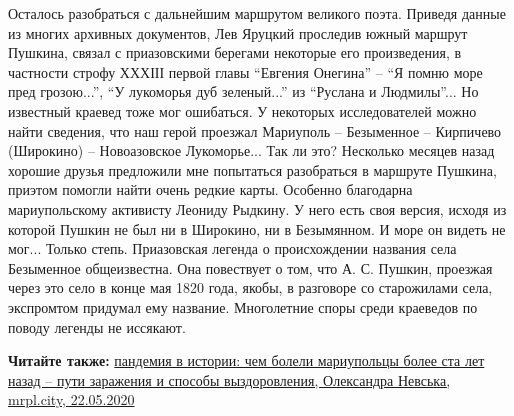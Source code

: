 
Осталось разобраться с дальнейшим маршрутом великого поэта. Приведя данные из
многих архивных документов, Лев Яруцкий проследив южный маршрут Пушкина, связал
с приазовскими берегами некоторые его произведения, в частности строфу ХХХІІІ
первой главы \enquote{Евгения Онегина} – \enquote{Я помню море пред грозою...}, \enquote{У лукоморья дуб
зеленый...} из \enquote{Руслана и Людмилы}... Но известный краевед тоже мог ошибаться. У
некоторых исследователей можно найти сведения, что наш герой проезжал Мариуполь
– Безыменное – Кирпичево (Широкино) – Новоазовское Лукоморье... Так ли это?
Несколько месяцев назад хорошие друзья предложили мне попытаться разобраться в
маршруте Пушкина, приэтом помогли найти очень редкие карты. Особенно благодарна
мариупольскому активисту Леониду Рыдкину. У него есть своя версия, исходя из
которой Пушкин не был ни в Широкино, ни в Безымянном. И море он видеть не
мог... Только степь. Приазовская легенда о происхождении названия села Безыменное
общеизвестна. Она повествует о том, что А. С. Пушкин, проезжая через это село в
конце мая 1820 года, якобы, в разговоре со старожилами села, экспромтом
придумал ему название. Многолетние споры среди краеведов по поводу легенды не
иссякают. 

\textbf{Читайте также:} \href{https://mrpl.city/news/view/pandemiya-v-istorii-chem-boleli-mariupoltsy-bolee-sta-let-nazadputi-zarazheniya-i-sposoby-vyzdorovleniya}{%
пандемия в истории: чем болели мариупольцы более ста лет назад – пути заражения и способы выздоровления, %
Олександра Невська, mrpl.city, 22.05.2020%
}

